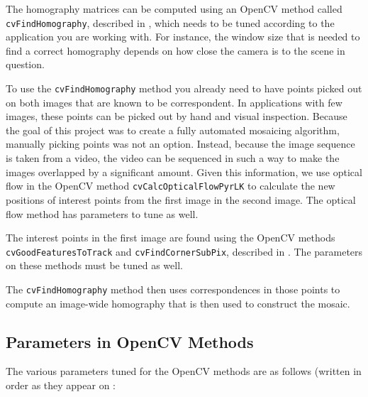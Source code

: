 \documentclass{article}
\begin{document}
The homography matrices can be computed using an OpenCV method called
\verb|cvFindHomography|, described in \cite{cvhomog}, which needs to be tuned
according to the application you are working with. For instance, the window
size that is needed to find a correct homography depends on how close the
camera is to the scene in question. 

To use the \verb|cvFindHomography| method you already need to have points
picked out on both images that are known to be correspondent. In applications
with few images, these points can be picked out by hand and visual inspection.
Because the goal of this project was to create a fully automated mosaicing
algorithm, manually picking points was not an option. Instead, because the
image sequence is taken from a video, the video can be sequenced in such a way
to make the images overlapped by a significant amount. Given this information,
we use optical flow in the OpenCV method \verb|cvCalcOpticalFlowPyrLK| to
calculate the new positions of interest points from the first image in the
second image. The optical flow method has parameters to tune as well. 

The interest points in the first image are found using the OpenCV methods
\verb|cvGoodFeaturesToTrack| and \verb|cvFindCornerSubPix|, described in
\cite{points}. The parameters on these methods must be tuned as well. 

The \verb|cvFindHomography| method then uses correspondences in those points to
compute an image-wide homography that is then used to construct the mosaic. 

\subsection{Parameters in OpenCV Methods}

The various parameters tuned for the OpenCV methods are as follows (written in order as they appear on \cite{cvhomogs, points}:
\end{document}
